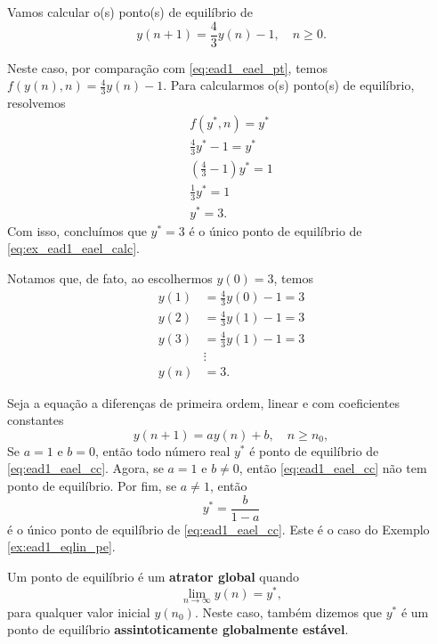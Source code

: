 \begin{ex}\label{ex:ead1_eqlin_pe}
  Vamos calcular o(s) ponto(s) de equilíbrio de
  \begin{equation}\label{eq:ex_ead1_eael_calc}
    y(n+1) = \frac{4}{3}y(n)-1,\quad n\geq 0.
  \end{equation}

  Neste caso, por comparação com \eqref{eq:ead1_eael_pt}, temos $\displaystyle f(y(n),n) = \frac{4}{3}y(n)-1$. Para calcularmos o(s) ponto(s) de equilíbrio, resolvemos
  \begin{gather}
    f(y^*,n) = y^* \\
    \frac{4}{3}y^*-1 = y^* \\
    \left(\frac{4}{3}-1\right)y^* = 1 \\
    \frac{1}{3}y^* = 1 \\
    y^* = 3.
  \end{gather}
  Com isso, concluímos que $y^*=3$ é o único ponto de equilíbrio de \eqref{eq:ex_ead1_eael_calc}.

  Notamos que, de fato, ao escolhermos $y(0)=3$, temos
  \begin{align}
    y(1) &= \frac{4}{3}y(0) - 1 = 3 \\
    y(2) &= \frac{4}{3}y(1) - 1 = 3 \\
    y(3) &= \frac{4}{3}y(1) - 1 = 3 \\
    &\vdots \\
    y(n) &= 3.
  \end{align}
\end{ex}

Seja a equação a diferenças de primeira ordem, linear e com coeficientes constantes
\begin{equation}\label{eq:ead1_eael_cc}
  y(n+1) = ay(n) + b,\quad n\geq n_0,
\end{equation}
Se $a=1$ e $b=0$, então todo número real $y^*$ é ponto de equilíbrio de \eqref{eq:ead1_eael_cc}. Agora, se $a=1$ e $b\neq 0$, então \eqref{eq:ead1_eael_cc} não tem ponto de equilíbrio. Por fim, se $a\neq 1$, então
\begin{equation}
  y^* = \frac{b}{1-a}
\end{equation}
é o único ponto de equilíbrio de \eqref{eq:ead1_eael_cc}. Este é o caso do Exemplo \ref{ex:ead1_eqlin_pe}.

Um ponto de equilíbrio é um {\bf atrator global} quando
\begin{equation}
  \lim_{n\to\infty} y(n) = y^*,
\end{equation}
para qualquer valor inicial $y(n_0)$. Neste caso, também dizemos que $y^*$ é um ponto de equilíbrio {\bf assintoticamente globalmente estável}.

